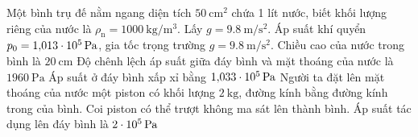 \begin{ex}
	Một bình trụ đế nằm ngang diện tích $\SI{50}{\centi\meter^2}$ chứa 1 lít nước, biết khối lượng riêng của nước là $\rho_{\mathrm{n}}=\SI{1000}{\kilogram/\meter^3}$. Lấy $g=\SI{9.8}{\meter/\second^2}$. Áp suất khí quyển $p_0=\SI{1.013E5}{\pascal}$, gia tốc trọng trường $g=\SI{9.8}{\meter/\second^2}$.
	\choiceTF
	{\True Chiều cao của nước trong bình là $\SI{20}{\centi\meter}$}
	{\True Độ chênh lệch áp suất giữa đáy bình và mặt thoáng của nước là $\SI{1960}{\pascal}$}
	{\True Áp suất ở đáy bình xấp xỉ bằng $\SI{1.033E5}{\pascal}$}
	{Người ta đặt lên mặt thoáng của nước một piston có khối lượng $\SI{2}{\kilogram}$, đường kính bằng đường kính trong của bình. Coi piston có thể trượt không ma sát lên thành bình. Áp suất tác dụng lên đáy bình là $\SI{2E5}{\pascal}$}
	\loigiai{}
\end{ex}
